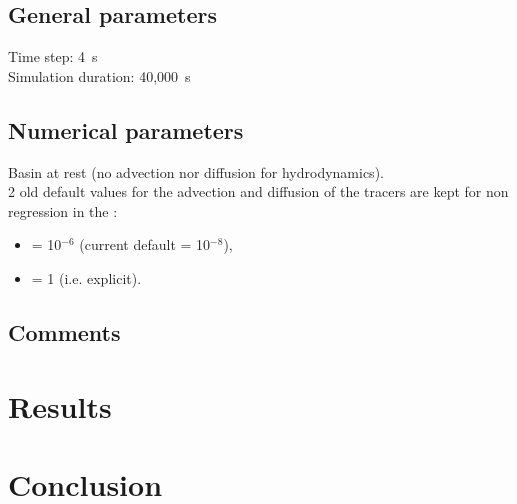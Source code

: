 \subsection{General parameters}
%
Time step: 4~s\\
Simulation duration: 40,000~s
%
%
%
\subsection{Numerical parameters}
%
Basin at rest (no advection nor diffusion for hydrodynamics).\\
%
2 old default values for the advection and diffusion of the tracers are kept for non regression
in the   :
\begin{itemize}
\item {} = 10$^{-6}$ (current default = 10$^{-8}$),
\item {} = 1 (i.e. explicit).
\end{itemize}
%
\subsection{Comments}
%
%
%
\section{Results}
%

%
\section{Conclusion}
%

%
%
